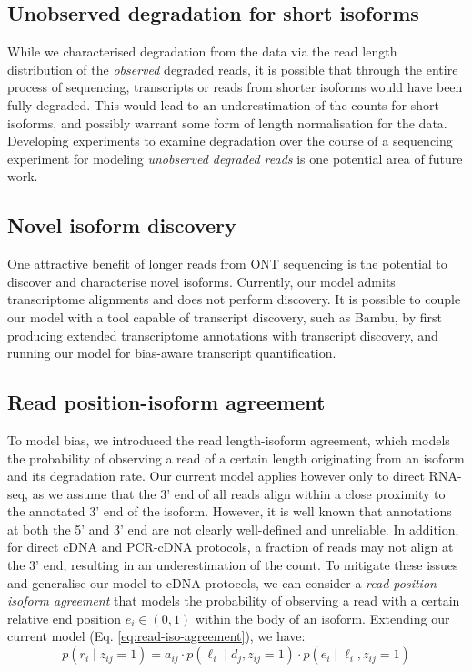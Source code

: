 \subsection{Unobserved degradation for short isoforms}

While we characterised degradation from the data via the read length distribution of the \textit{observed} degraded reads, it is possible that through the entire process of sequencing, transcripts or reads from shorter isoforms would have been fully degraded. This would lead to an underestimation of the counts for short isoforms, and possibly warrant some form of length normalisation for the data. Developing experiments to examine degradation over the course of a sequencing experiment for modeling \textit{unobserved degraded reads} is one potential area of future work.  

\subsection{Novel isoform discovery}

One attractive benefit of longer reads from ONT sequencing is the potential to discover and characterise novel isoforms. Currently, our model admits transcriptome alignments and does not perform discovery. It is possible to couple our model with a tool capable of transcript discovery, such as Bambu, by first producing extended transcriptome annotations with transcript discovery, and running our model for bias-aware transcript quantification.  

\subsection{Read position-isoform agreement}

To model bias, we introduced the read length-isoform agreement, which models the probability of observing a read of a certain length originating from an isoform and its degradation rate. Our current model applies however only to direct RNA-seq, as we assume that the 3' end of all reads align within a close proximity to the annotated 3' end of the isoform. However, it is well known that annotations at both the 5' and 3' end are not clearly well-defined and unreliable. In addition, for direct cDNA and PCR-cDNA protocols, a fraction of reads may not align at the 3' end, resulting in an underestimation of the count. To mitigate these issues and generalise our model to cDNA protocols, we can consider a \textit{read position-isoform agreement} that models the probability of observing a read with a certain relative end position $e_i\in(0,1)$ within the body of an isoform. Extending our current model (Eq. \ref{eq:read-iso-agreement}), we have:
\begin{equation}
    p(r_i\mid z_{ij}=1) = a_{ij}\cdot p(\ell_i\mid d_j, z_{ij}=1)\cdot p(e_i\mid \ell_i,z_{ij}=1)
\end{equation}
